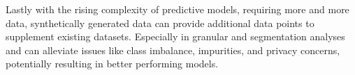 \documentclass[fleqn,moreauthors,10pt]{ds_report}
\begin{document}
Lastly with the rising complexity of predictive models, requiring more and more data, synthetically generated data can provide additional data points to supplement existing datasets. Especially in granular and segmentation analyses and can alleviate issues like class imbalance, impurities, and privacy concerns, potentially resulting in better performing models. %


\end{document}

